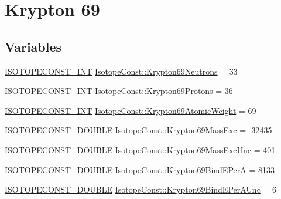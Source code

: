 \hypertarget{group___isotope_const-_krypton-_kr69}{}\section{Krypton 69}
\label{group___isotope_const-_krypton-_kr69}
\subsection*{Variables}
\begin{DoxyCompactItemize}
\item 
\mbox{\hyperlink{group___isotope_const-_macros_ga5f18360b3e99483a35c32d789e62621c}{I\+S\+O\+T\+O\+P\+E\+C\+O\+N\+S\+T\+\_\+\+I\+NT}} \mbox{\hyperlink{group___isotope_const-_krypton-_kr69_ga7afee38fb60f20db1f87934ee04de721}{Isotope\+Const\+::\+Krypton69\+Neutrons}} = 33
\item 
\mbox{\hyperlink{group___isotope_const-_macros_ga5f18360b3e99483a35c32d789e62621c}{I\+S\+O\+T\+O\+P\+E\+C\+O\+N\+S\+T\+\_\+\+I\+NT}} \mbox{\hyperlink{group___isotope_const-_krypton-_kr69_gabe646401dc215e4be6ecb44de05e8d0e}{Isotope\+Const\+::\+Krypton69\+Protons}} = 36
\item 
\mbox{\hyperlink{group___isotope_const-_macros_ga5f18360b3e99483a35c32d789e62621c}{I\+S\+O\+T\+O\+P\+E\+C\+O\+N\+S\+T\+\_\+\+I\+NT}} \mbox{\hyperlink{group___isotope_const-_krypton-_kr69_gabe918a4c70a42747cafc009ee599786a}{Isotope\+Const\+::\+Krypton69\+Atomic\+Weight}} = 69
\item 
\mbox{\hyperlink{group___isotope_const-_macros_ga8f45a7272ce02c0b4c65c44636ed719a}{I\+S\+O\+T\+O\+P\+E\+C\+O\+N\+S\+T\+\_\+\+D\+O\+U\+B\+LE}} \mbox{\hyperlink{group___isotope_const-_krypton-_kr69_gac728498a5cc71630c23511b001d3847f}{Isotope\+Const\+::\+Krypton69\+Mass\+Exc}} = -\/32435
\item 
\mbox{\hyperlink{group___isotope_const-_macros_ga8f45a7272ce02c0b4c65c44636ed719a}{I\+S\+O\+T\+O\+P\+E\+C\+O\+N\+S\+T\+\_\+\+D\+O\+U\+B\+LE}} \mbox{\hyperlink{group___isotope_const-_krypton-_kr69_gace9a95b7b1a81e20e383529ccf1ebe35}{Isotope\+Const\+::\+Krypton69\+Mass\+Exc\+Unc}} = 401
\item 
\mbox{\hyperlink{group___isotope_const-_macros_ga8f45a7272ce02c0b4c65c44636ed719a}{I\+S\+O\+T\+O\+P\+E\+C\+O\+N\+S\+T\+\_\+\+D\+O\+U\+B\+LE}} \mbox{\hyperlink{group___isotope_const-_krypton-_kr69_ga2f5d5d98621cedac7e24077a99b73d27}{Isotope\+Const\+::\+Krypton69\+Bind\+E\+PerA}} = 8133
\item 
\mbox{\hyperlink{group___isotope_const-_macros_ga8f45a7272ce02c0b4c65c44636ed719a}{I\+S\+O\+T\+O\+P\+E\+C\+O\+N\+S\+T\+\_\+\+D\+O\+U\+B\+LE}} \mbox{\hyperlink{group___isotope_const-_krypton-_kr69_ga7cb776870c7537b1767280d24df64b7f}{Isotope\+Const\+::\+Krypton69\+Bind\+E\+Per\+A\+Unc}} = 6

\end{DoxyCompactItemize}
